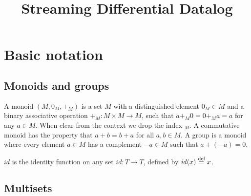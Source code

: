 \documentclass[10pt]{article}
\title{Streaming Differential Datalog}
\newcommand{\code}[1]{\texttt{#1}}
\newcommand{\Z}{\mathbb{Z}}  %
\newcommand{\N}{\mathbb{N}}  %
\newcommand{\B}{\mathbb{B}}  %
\newcommand{\multiset}[1]{\mathit{multiset}_{#1}}
\newcommand{\set}[1]{\mathit{set}_{#1}}
\newcommand{\id}{\ensuremath{\mathit{id}}} %
\newcommand{\defn}{\stackrel{\textrm{\scriptsize def}}{=}}
\begin{document}
\maketitle

\section{Basic notation}

\begin{comment}
\subsection{Types}

$\N$ is the set of natural numbers, while $\Z$ is the set of integers.

Our language will deal with a set of base types $B$ that includes
$\N$, $\Z$, \code{string}, $\B$ (Booleans), $\mathbf{unit}$.

Derived types include: tuples, vectors (lists), functions.

$$T = B \;|\; T \times T \;|\; T^* \;|\; T \rightarrow T$$


A typing context is a map that assigns types to variable names.
$\Gamma = x_1 : T_1, x_2 : T_2, \ldots, x_m : T_m$, where $T_i$ is the
type of variable $x_i$.
\end{comment}

\subsection{Monoids and groups}

A monoid $(M, 0_M, +_M)$ is a set $M$ with a distinguished element
$0_M \in M$ and a binary associative operation $+_M : M \times M
\rightarrow M$, such that $a +_M 0 = 0 +_M a = a$ for any $a \in M$.
When clear from the context we drop the index $_M$.  A commutative
monoid has the property that $a + b = b + a$ for all $a, b \in M$.  A
group is a monoid where every element $a \in M$ has a complement $-a
\in M$ such that $a + (-a) = 0$.

$\id$ is the identity function on any set $\id: T \rightarrow T$,
defined by $\id(x) \defn x$.

\subsection{Multisets}
\end{document}
